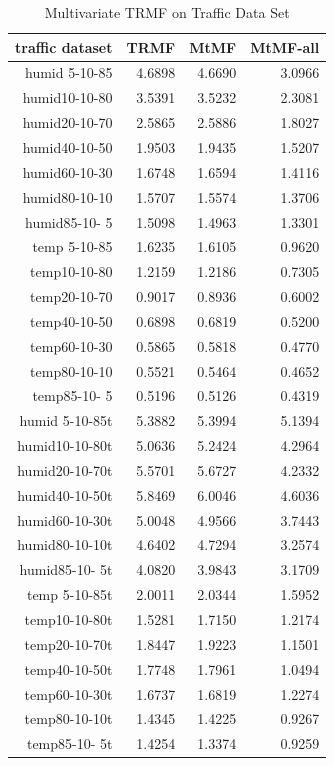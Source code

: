 \begin{table}[htbp]
\caption{Multivariate TRMF on Traffic Data Set}
\label{traffic}
\begin{tabular}{r | r r r}
traffic dataset	&TRMF	&MtMF	&MtMF-all \\ \hline
humid 5-10-85	&4.6898	&4.6690	&3.0966\\
humid10-10-80	&3.5391	&3.5232	&2.3081\\
humid20-10-70	&2.5865	&2.5886	&1.8027\\
humid40-10-50	&1.9503	&1.9435	&1.5207\\
humid60-10-30	&1.6748	&1.6594	&1.4116\\
humid80-10-10	&1.5707	&1.5574	&1.3706\\
humid85-10- 5	&1.5098	&1.4963	&1.3301\\
 temp 5-10-85	&1.6235	&1.6105	&0.9620\\
 temp10-10-80	&1.2159	&1.2186	&0.7305\\
 temp20-10-70	&0.9017	&0.8936	&0.6002\\
 temp40-10-50	&0.6898	&0.6819	&0.5200\\
 temp60-10-30	&0.5865	&0.5818	&0.4770\\
 temp80-10-10	&0.5521	&0.5464	&0.4652\\
 temp85-10- 5	&0.5196	&0.5126	&0.4319\\
humid 5-10-85t	&5.3882	&5.3994	&5.1394\\
humid10-10-80t	&5.0636	&5.2424	&4.2964\\
humid20-10-70t	&5.5701	&5.6727	&4.2332\\
humid40-10-50t	&5.8469	&6.0046	&4.6036\\
humid60-10-30t	&5.0048	&4.9566	&3.7443\\
humid80-10-10t	&4.6402	&4.7294	&3.2574\\
humid85-10- 5t	&4.0820	&3.9843	&3.1709\\
 temp 5-10-85t	&2.0011	&2.0344	&1.5952\\
 temp10-10-80t	&1.5281	&1.7150	&1.2174\\
 temp20-10-70t	&1.8447	&1.9223	&1.1501\\
 temp40-10-50t	&1.7748	&1.7961	&1.0494\\
 temp60-10-30t	&1.6737	&1.6819	&1.2274\\
 temp80-10-10t	&1.4345	&1.4225	&0.9267\\
 temp85-10- 5t	&1.4254	&1.3374	&0.9259\\

\end{tabular}
\end{table}

